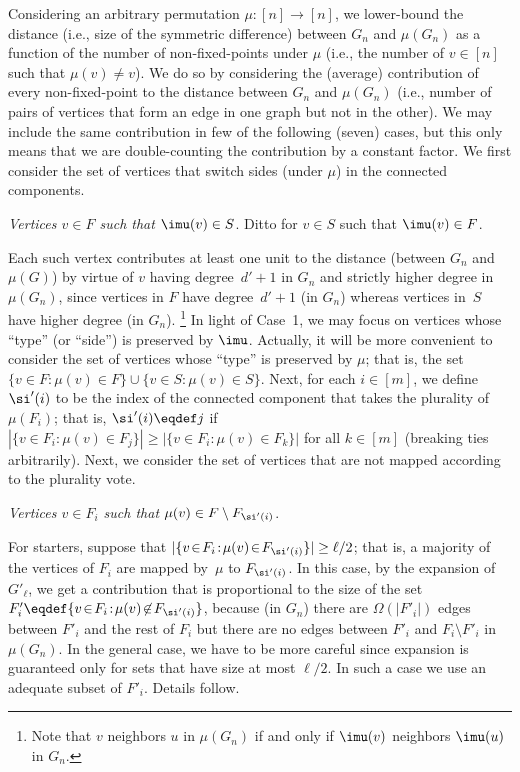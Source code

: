 Considering an arbitrary permutation $\mu:[n]\to[n]$,
we lower-bound the distance
(i.e., size of the symmetric difference)
between $G_n$ and $\mu(G_n)$
as a function of the number of non-fixed-points under $\mu$
(i.e., the number of $v\in[n]$ such that $\mu(v)\neq v$).
We do so by considering the (average) contribution
of every non-fixed-point to the distance between $G_n$ and $\mu(G_n)$
(i.e., number of pairs of vertices that form an edge in one graph
but not in the other). We may include the same contribution in
few of the following (seven) cases, but this only means that
we are double-counting the contribution by a constant factor.
We first consider the set of vertices that switch sides
(under $\mu$) in the connected components.

\BDes
\item[{\em Case 1}:] {\em Vertices $v\in F$ such that $\imu(v)\in S$}.
Ditto for $v\in S$ such that $\imu(v)\in F$.

Each such vertex contributes at least one unit to the distance
(between $G_n$ and $\mu(G)$)
by virtue of $v$ having degree~$d'+1$ in $G_n$
and strictly higher degree in $\mu(G_n)$,
since vertices in $F$ have degree~$d'+1$ (in $G_n$)
whereas vertices in~$S$ have higher degree (in $G_n$).
\footnote{Note that $v$ neighbors $u$ in $\mu(G_n)$
if and only if $\imu(v)$ neighbors $\imu(u)$ in $G_n$.}
%
%
%
%
%
\EDes
In light of Case~1, we may focus on vertices whose ``type''
(or ``side'') is preserved by $\imu$. Actually, it will be more convenient
to consider the set of vertices whose ``type'' is preserved by $\mu$;
%
that is, the set
$\{v\!\in\!F\!:\!\mu(v)\!\in\!F\}\cup\{v\!\in\!S\!:\!\mu(v)\!\in\!S\}$.
%
Next, for each $i\in[m]$, we define $\si'(i)$ to be the index
of the connected component that takes the plurality of $\mu(F_i)$;
that is, $\si'(i)\eqdef j$
if $|\{v\in F_i:\mu(v)\in F_j\}|\geq|\{v\in F_i:\mu(v)\in F_k\}|$
for all $k\in[m]$ (breaking ties arbitrarily).
Next, we consider the set of vertices that are not mapped
according to the plurality vote.

\BDes
\item[{\em Case 2}:]
{\em Vertices $v\in F_i$ such that $\mu(v)\in F\setminus F_{\si'(i)}$}.

For starters, suppose that
$|\{v\!\in\!F_i\!:\!\mu(v)\!\in\!F_{\si'(i)}\}|\geq\ell/2$;
that is, a majority of the vertices of $F_i$ are mapped by~$\mu$
to $F_{\si'(i)}$. In this case, by the expansion of $G'_\ell$,
we get a contribution that is proportional to the size
of the set $F'_i\eqdef\{v\!\in\!F_i\!:\!\mu(v)\!\not\in\!F_{\si'(i)}\}$,
because (in $G_n$) there are $\Omega(|F'_i|)$ edges
between $F'_i$ and the rest of $F_i$
but there are no edges between $F'_i$ and $F_i\setminus F'_i$ in $\mu(G_n)$.
In the general case, we have to be more careful since expansion
is guaranteed only for sets that have size at most $\ell/2$.
In such a case we use an adequate subset of $F'_i$.
Details follow.


